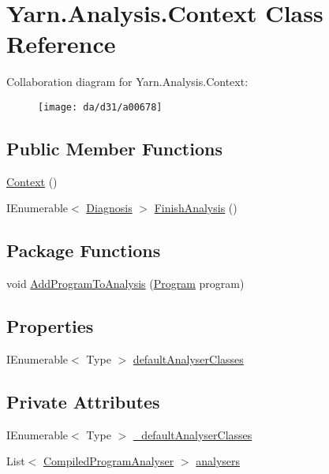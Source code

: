 \hypertarget{a00035}{\section{Yarn.\-Analysis.\-Context Class Reference}
\label{a00035}
}


Collaboration diagram for Yarn.\-Analysis.\-Context\-:
\nopagebreak
\begin{figure}[H]
\begin{center}
\leavevmode
\texttt{[image: da/d31/a00678]}
\end{center}
\end{figure}
\subsection*{Public Member Functions}
\begin{DoxyCompactItemize}
\item 
\hyperlink{a00035_a8e2c56843e8d374b0f90e23326d8d14a}{Context} ()
\item 
I\-Enumerable$<$ \hyperlink{a00069}{Diagnosis} $>$ \hyperlink{a00035_a1eadea062a5899a64d00ea0172cbbb43}{Finish\-Analysis} ()
\end{DoxyCompactItemize}
\subsection*{Package Functions}
\begin{DoxyCompactItemize}
\item 
void \hyperlink{a00035_a60255a6d54f296d199507acef251244c}{Add\-Program\-To\-Analysis} (\hyperlink{a00124}{Program} program)
\end{DoxyCompactItemize}
\subsection*{Properties}
\begin{DoxyCompactItemize}
\item 
I\-Enumerable$<$ Type $>$ \hyperlink{a00035_afdf24f2512251c2203ba1bde8f4a0f90}{default\-Analyser\-Classes}
\end{DoxyCompactItemize}
\subsection*{Private Attributes}
\begin{DoxyCompactItemize}
\item 
I\-Enumerable$<$ Type $>$ \hyperlink{a00035_ad06829cf848a5936db5724ebced758ec}{\-\_\-default\-Analyser\-Classes}
\item 
List$<$ \hyperlink{a00031}{Compiled\-Program\-Analyser} $>$ \hyperlink{a00035_aa5c7eaa90ad9c47969a3b336080d8991}{analysers}
\end{DoxyCompactItemize}


